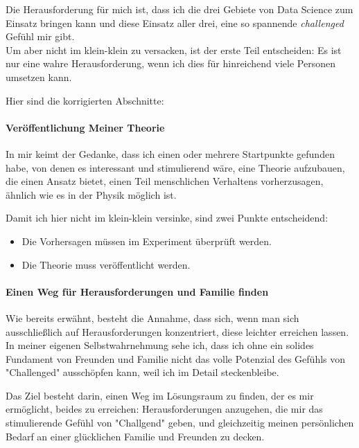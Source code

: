 Die Herausforderung für mich ist, dass ich die drei Gebiete von Data Science zum Einsatz bringen kann und diese Einsatz aller drei, eine so spannende \textit{challenged} Gefühl mir gibt.\\

Um aber nicht im klein-klein zu versacken, ist der erste Teil entscheiden: Es ist nur eine wahre Herausforderung, wenn ich dies für hinreichend viele Personen umsetzen kann.

Hier sind die korrigierten Abschnitte:

\paragraph{Veröffentlichung Meiner Theorie}
In mir keimt der Gedanke, dass ich einen oder mehrere Startpunkte gefunden habe, von denen es interessant und stimulierend wäre, eine Theorie aufzubauen, die einen Ansatz bietet, einen Teil menschlichen Verhaltens vorherzusagen, ähnlich wie es in der Physik möglich ist.

Damit ich hier nicht im klein-klein versinke, sind zwei Punkte entscheidend:
\begin{itemize}
    \item Die Vorhersagen müssen im Experiment überprüft werden.
    \item Die Theorie muss veröffentlicht werden.
\end{itemize}

\paragraph{Einen Weg für Herausforderungen und Familie finden}
Wie bereits erwähnt, besteht die Annahme, dass sich, wenn man sich ausschließlich auf Herausforderungen konzentriert, diese leichter erreichen lassen. In meiner eigenen Selbstwahrnehmung sehe ich, dass ich ohne ein solides Fundament von Freunden und Familie nicht das volle Potenzial des Gefühls von "Challenged" ausschöpfen kann, weil ich im Detail steckenbleibe.

Das Ziel besteht darin, einen Weg im Lösungsraum zu finden, der es mir ermöglicht, beides zu erreichen: Herausforderungen anzugehen, die mir das stimulierende Gefühl von "Challgend" geben, und gleichzeitig meinen persönlichen Bedarf an einer glücklichen Familie und Freunden zu decken.
